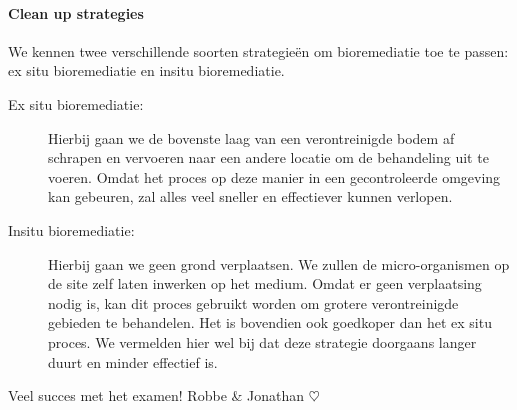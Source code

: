 \documentclass[a4paper,kul]{kulakarticle} %
\begin{document}
\paragraph{Clean up strategies} 
We kennen twee verschillende soorten strategieën om bioremediatie toe te passen: ex situ bioremediatie en insitu bioremediatie.
\begin{description}
	\item[Ex situ bioremediatie:] Hierbij gaan we de bovenste laag van een verontreinigde bodem af schrapen en vervoeren naar een andere locatie om de behandeling uit te voeren. Omdat het proces op deze manier in een gecontroleerde omgeving kan gebeuren, zal alles veel sneller en effectiever kunnen verlopen. 
	\item[Insitu bioremediatie:] Hierbij gaan we geen grond verplaatsen. We zullen de micro-organismen op de site zelf laten inwerken op het medium. Omdat er geen verplaatsing nodig is, kan dit proces gebruikt worden om grotere verontreinigde gebieden te behandelen. Het is bovendien ook goedkoper dan het ex situ proces. We vermelden hier wel bij dat deze strategie doorgaans langer duurt en minder effectief is. \\ 
\end{description}
\vfill
\begin{center}
	Veel succes met het examen! Robbe \& Jonathan $\heartsuit$
\end{center}
\end{document}
